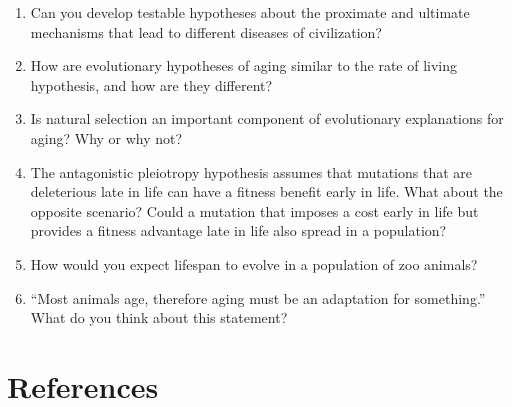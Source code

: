 \documentclass[
]{book}
\begin{document}
\begin{enumerate}
\def\labelenumi{\arabic{enumi}.}
\item
  Can you develop testable hypotheses about the proximate and ultimate mechanisms that lead to different diseases of civilization?
\item
  How are evolutionary hypotheses of aging similar to the rate of living hypothesis, and how are they different?
\item
  Is natural selection an important component of evolutionary explanations for aging? Why or why not?
\item
  The antagonistic pleiotropy hypothesis assumes that mutations that are deleterious late in life can have a fitness benefit early in life. What about the opposite scenario? Could a mutation that imposes a cost early in life but provides a fitness advantage late in life also spread in a population?
\item
  How would you expect lifespan to evolve in a population of zoo animals?
\item
  ``Most animals age, therefore aging must be an adaptation for something.'' What do you think about this statement?
\end{enumerate}

\hypertarget{references-12}{%
\section{References}\label{references-12}}
\end{document}
